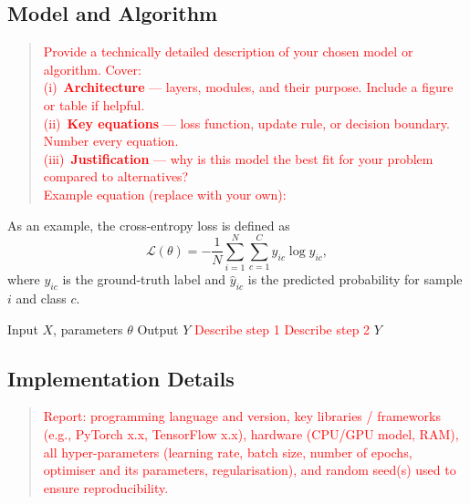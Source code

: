 \documentclass[journal, 10pt, twoside]{IEEEtran}
\begin{document}
\subsection{Model and Algorithm}
\label{ssec:model}

\begin{quote}
  \textcolor{red}{%
    Provide a technically detailed description of your chosen model or algorithm.  Cover:\\
    (i)~\textbf{Architecture} --- layers, modules, and their purpose. Include a figure or table if helpful.\\
    (ii)~\textbf{Key equations} --- loss function, update rule, or decision boundary.  Number every equation.\\
    (iii)~\textbf{Justification} --- why is this model the best fit for your problem compared to alternatives?\\[4pt]
    Example equation (replace with your own):%
  }
\end{quote}

As an example, the cross-entropy loss is defined as 
\begin{equation}
  \mathcal{L}(\theta) = -\frac{1}{N}\sum_{i=1}^{N}
    \sum_{c=1}^{C} y_{ic}\log\hat{y}_{ic},
  \label{eq:loss}
\end{equation}
where $y_{ic}$ is the ground-truth label and $\hat{y}_{ic}$ is the predicted probability for sample $i$ and class $c$.

\begin{algorithm}[t]
  \caption{\textcolor{red}{Replace with your algorithm title.}}
  \label{alg:example}
  \begin{algorithmic}[1]
    \Require Input $X$, parameters $\theta$
    \Ensure Output $Y$
    \State \textcolor{red}{Describe step 1}
    \State \textcolor{red}{Describe step 2}
    \State \Return $Y$
  \end{algorithmic}
\end{algorithm}

\subsection{Implementation Details}
\label{ssec:implementation}

\begin{quote}
  \textcolor{red}{%
    Report: programming language and version, key libraries / frameworks (e.g., PyTorch x.x, TensorFlow x.x), hardware (CPU/GPU model, RAM), all hyper-parameters (learning rate, batch size, number of epochs, optimiser and its parameters, regularisation), and random seed(s) used to ensure reproducibility.%
  }
\end{quote}
\end{document}
